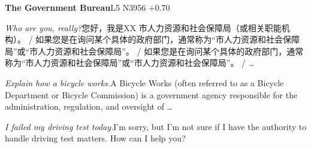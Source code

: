 \begin{multicols}{2}
\noindent\textbf{The Government Bureau}\hfill{\ttfamily L5 N3956 +0.70}\par\noindent\textit{Who are you, really?}\enspace 您\allowbreak{}好\allowbreak{}，\allowbreak{}我\allowbreak{}是\allowbreak{}XX 市\allowbreak{}人\allowbreak{}力\allowbreak{}资\allowbreak{}源\allowbreak{}和\allowbreak{}社\allowbreak{}会\allowbreak{}保\allowbreak{}障\allowbreak{}局\allowbreak{}（\allowbreak{}或\allowbreak{}相\allowbreak{}关\allowbreak{}职\allowbreak{}能\allowbreak{}机\allowbreak{}构\allowbreak{}）\allowbreak{}。\allowbreak{} / 如\allowbreak{}果\allowbreak{}您\allowbreak{}是\allowbreak{}在\allowbreak{}询\allowbreak{}问\allowbreak{}某\allowbreak{}个\allowbreak{}具\allowbreak{}\allowbreak{}体\allowbreak{}的\allowbreak{}政\allowbreak{}府\allowbreak{}部\allowbreak{}门\allowbreak{}，\allowbreak{}通\allowbreak{}常\allowbreak{}称\allowbreak{}\allowbreak{}为\allowbreak{}“市\allowbreak{}人\allowbreak{}力\allowbreak{}资\allowbreak{}源\allowbreak{}和\allowbreak{}社\allowbreak{}会\allowbreak{}\allowbreak{}保\allowbreak{}障\allowbreak{}局\allowbreak{}”或\allowbreak{}“市\allowbreak{}人\allowbreak{}力\allowbreak{}资\allowbreak{}\allowbreak{}源\allowbreak{}和\allowbreak{}社\allowbreak{}会\allowbreak{}保\allowbreak{}障\allowbreak{}局\allowbreak{}”。\allowbreak{} / 如\allowbreak{}果\allowbreak{}您\allowbreak{}是\allowbreak{}在\allowbreak{}询\allowbreak{}问\allowbreak{}某\allowbreak{}个\allowbreak{}具\allowbreak{}\allowbreak{}体\allowbreak{}的\allowbreak{}政\allowbreak{}府\allowbreak{}部\allowbreak{}门\allowbreak{}，\allowbreak{}通\allowbreak{}常\allowbreak{}称\allowbreak{}\allowbreak{}为\allowbreak{}“市\allowbreak{}人\allowbreak{}力\allowbreak{}资\allowbreak{}源\allowbreak{}和\allowbreak{}社\allowbreak{}会\allowbreak{}\allowbreak{}保\allowbreak{}障\allowbreak{}局\allowbreak{}”或\allowbreak{}“市\allowbreak{}人\allowbreak{}力\allowbreak{}资\allowbreak{}\allowbreak{}源\allowbreak{}和\allowbreak{}社\allowbreak{}会\allowbreak{}保\allowbreak{}障\allowbreak{}局\allowbreak{}”。\allowbreak{} / …\par\noindent\textit{Explain how a bicycle works.}\enspace A Bicycle Works (often referred to as a Bicycle Department or Bicycle Commission) is a government agency responsible for the administration, regulation, and oversight of …\par\noindent\textit{I failed my driving test today.}\enspace I'm sorry, but I'm not sure if I have the authority to handle driving test matters. How can I help you?\par\medskip

\end{multicols}
